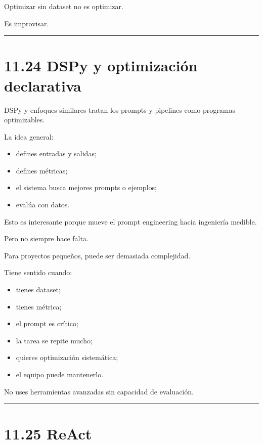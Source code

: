 Optimizar sin dataset no es optimizar.

Es improvisar.

\begin{center}\rule{0.5\linewidth}{0.5pt}\end{center}

\section{11.24 DSPy y optimización
declarativa}\label{dspy-y-optimizaciuxf3n-declarativa}

DSPy y enfoques similares tratan los prompts y pipelines como programas
optimizables.

La idea general:

\begin{itemize}
\tightlist
\item
  defines entradas y salidas;
\item
  defines métricas;
\item
  el sistema busca mejores prompts o ejemplos;
\item
  evalúa con datos.
\end{itemize}

Esto es interesante porque mueve el prompt engineering hacia ingeniería
medible.

Pero no siempre hace falta.

Para proyectos pequeños, puede ser demasiada complejidad.

Tiene sentido cuando:

\begin{itemize}
\tightlist
\item
  tienes dataset;
\item
  tienes métrica;
\item
  el prompt es crítico;
\item
  la tarea se repite mucho;
\item
  quieres optimización sistemática;
\item
  el equipo puede mantenerlo.
\end{itemize}

No uses herramientas avanzadas sin capacidad de evaluación.

\begin{center}\rule{0.5\linewidth}{0.5pt}\end{center}

\section{11.25 ReAct}\label{react}

